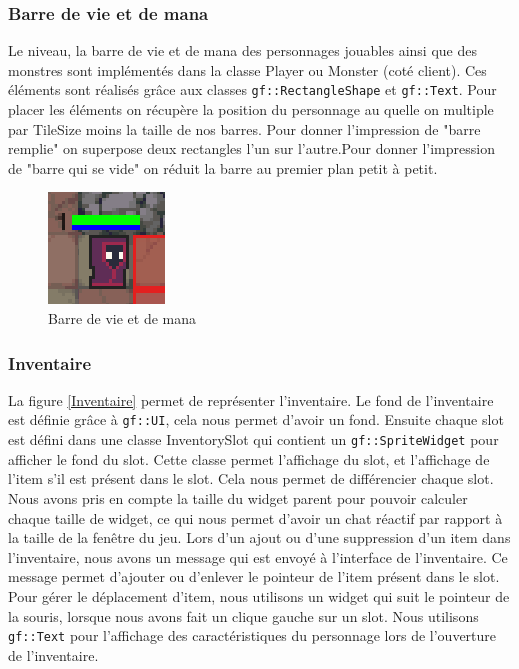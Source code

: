 \documentclass[a4paper, 12pt, twoside]{article}
\begin{document}
\subsubsection{Barre de vie et de mana}
Le niveau, la barre de vie et de mana des personnages jouables ainsi que des monstres sont implémentés dans la classe Player ou Monster (coté client). Ces éléments sont réalisés grâce aux classes \verb!gf::RectangleShape! et \verb!gf::Text!. Pour placer les éléments on récupère la position du personnage au quelle on multiple par TileSize moins la taille de nos barres. Pour donner l'impression de "barre remplie" on superpose deux rectangles l'un sur l'autre.Pour donner l'impression de "barre qui se vide" on réduit la barre au premier plan petit à petit.
\begin{figure}[H]
    \begin{center}
    \includegraphics[scale=0.5]{./GraphiqueInGame/BarreVieMana}
    \caption{Barre de vie et de mana}
    \end{center}
\end{figure}

\subsubsection{Inventaire}
La figure \ref{Inventaire} permet de représenter l'inventaire. Le fond de l'inventaire est définie grâce à \verb!gf::UI!, cela nous permet d'avoir un fond. Ensuite chaque slot est défini dans une classe InventorySlot qui contient un \verb!gf::SpriteWidget! pour afficher le fond du slot. Cette classe permet l'affichage du slot, et l'affichage de l'item s'il est présent dans le slot. Cela nous permet de différencier chaque slot. Nous avons pris en compte la taille du widget parent pour pouvoir calculer chaque taille de widget, ce qui nous permet d'avoir un chat réactif par rapport à la taille de la fenêtre du jeu. Lors d'un ajout ou d'une suppression d'un item dans l'inventaire, nous avons un message qui est envoyé à l'interface de l'inventaire. Ce message permet d'ajouter ou d'enlever le pointeur de l'item présent dans le slot. Pour gérer le déplacement d'item, nous utilisons un widget qui suit le pointeur de la souris, lorsque nous avons fait un clique gauche sur un slot. Nous utilisons \verb!gf::Text! pour l'affichage des caractéristiques du personnage lors de l'ouverture de l'inventaire.
\end{document}
